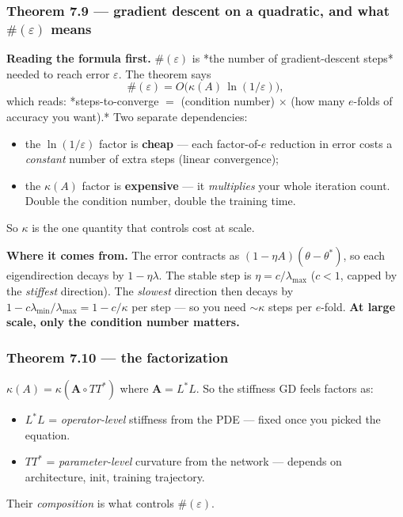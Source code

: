 \documentclass[11pt]{article}
\begin{document}
\subsubsection*{Theorem 7.9 --- gradient descent on a quadratic, and what $\#(\varepsilon)$ means}

\textbf{Reading the formula first.} $\#(\varepsilon)$ is *the number of
gradient-descent steps* needed to reach error $\varepsilon$. The theorem
says
\[\#(\varepsilon) = O\big(\kappa(A)\,\ln(1/\varepsilon)\big),\]
which reads: *steps-to-converge $=$ (condition number) $\times$ (how many
$e$-folds of accuracy you want).* Two separate dependencies:
\begin{itemize}
\item the $\ln(1/\varepsilon)$ factor is \textbf{cheap} --- each factor-of-$e$
reduction in error costs a \emph{constant} number of extra steps (linear
convergence);
\item the $\kappa(A)$ factor is \textbf{expensive} --- it \emph{multiplies} your whole
iteration count. Double the condition number, double the training time.
\end{itemize}
So $\kappa$ is the one quantity that controls cost at scale.

\textbf{Where it comes from.} The error contracts as $(1 - \eta A)(\theta -
\theta^*)$, so each eigendirection decays by $1 - \eta\lambda$. The stable
step is $\eta = c/\lambda_{\max}$ ($c<1$, capped by the \emph{stiffest}
direction). The \emph{slowest} direction then decays by $1 - c\lambda_{\min}/
\lambda_{\max} = 1 - c/\kappa$ per step --- so you need $\sim \kappa$ steps
per $e$-fold. \textbf{At large scale, only the condition number matters.}

\subsubsection*{Theorem 7.10 --- the factorization}

$\kappa(A) = \kappa(\mathbf A \circ T T^*)$ where $\mathbf A = L^* L$. So
the stiffness GD feels factors as:
\begin{itemize}
\item $L^* L$ = \emph{operator-level} stiffness from the PDE --- fixed once you
picked the equation.
\item $T T^*$ = \emph{parameter-level} curvature from the network --- depends on
architecture, init, training trajectory.
\end{itemize}
Their \emph{composition} is what controls $\#(\varepsilon)$.
\end{document}
